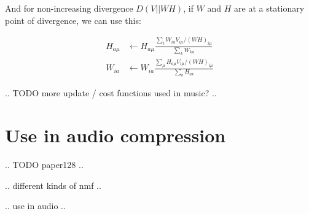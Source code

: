 And for non-increasing divergence $D(V||WH)$, if $W$ and $H$ are at a stationary point of divergence, we can use this:

\begin{align}
H_{a \mu} & \leftarrow H_{a \mu} \frac{\sum_i W_{ia} V_{i \mu} / (WH)_{i \mu}}{\sum_k W_{ka}} \\
W_{ia} & \leftarrow W_{ia} \frac{\sum_\mu H_{a \mu} V_{i \mu} / (WH)_{i \mu}}{\sum_v H_{av}}
\end{align}

.. TODO more update / cost functions used in music? ..

\section{Use in audio compression}
.. TODO paper128 ..

.. different kinds of nmf ..

.. use in audio ..
